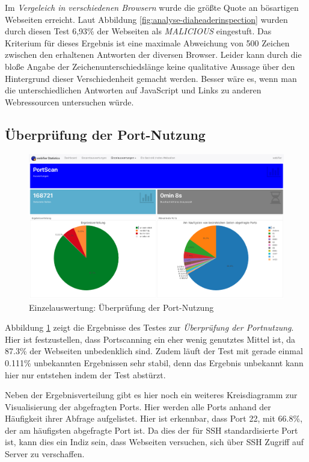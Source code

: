 Im \textit{Vergeleich in verschiedenen Browsern} wurde die größte Quote an bösartigen Webseiten
erreicht. Laut Abbildung \ref{fig:analyse-diaheaderinspection} wurden durch diesen Test 6,93\% der
Webseiten als \textit{MALICIOUS} eingestuft. Das Kriterium für dieses Ergebnis ist eine maximale
Abweichung von 500 Zeichen zwischen den erhaltenen Antworten der diversen Browser. Leider kann durch die bloße Angabe der Zeichenunterschiedslänge keine
qualitative Aussage über den Hintergrund dieser Verschiedenheit gemacht werden. Besser wäre es,
wenn man die unterschiedlichen Antworten auf JavaScript und Links zu anderen Webressourcen untersuchen würde.

\subsection{Überprüfung der Port-Nutzung}

\begin{figure}[H]
  \centering
  \includegraphics[width=\textwidth]{images/stats/portscan}
  \caption[Einzelauswertung: Überprüfung der Port-Nutzung]{Einzelauswertung: Überprüfung der Port-Nutzung\protect\footnotemark}
  \label{fig:analyse-portscan}
\end{figure}

Abbildung \ref{fig:analyse-portscan} zeigt die Ergebnisse des Testes zur \textit{Überprüfung der
Portnutzung}.
Hier ist festzustellen, dass Portscanning ein eher wenig genutztes Mittel ist, da 87.3\% der Webseiten unbedenklich sind. Zudem läuft der Test mit gerade einmal 0.111\% unbekannten Ergebnissen sehr stabil, denn das Ergebnis unbekannt kann hier nur entstehen indem der Test abstürzt.

Neben der Ergebnisverteilung gibt es hier noch ein weiteres Kreisdiagramm zur Visualisierung der abgefragten Ports. Hier werden alle Ports anhand der Häufigkeit ihrer Abfrage aufgelistet. Hier ist erkennbar, dass Port 22, mit 66.8\%, der am häufigsten abgefragte Port ist. Da dies der für \ac{SSH} standardisierte Port ist, kann dies ein Indiz sein, dass Webseiten versuchen, sich über \ac{SSH} Zugriff auf Server zu verschaffen.

